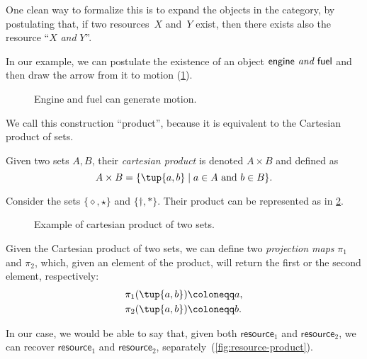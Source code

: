 One clean way to formalize this is to expand the objects in the category, by postulating that, if two resources~$X$ and~$Y$ exist, then there exists also the resource ``$X$ \emph{and} $Y$''.

In our example, we can postulate the existence of an object $\mathsf{engine} \emph{ and }
\mathsf{fuel}$ and then draw the arrow from it to motion (\cref{fig:e13}).

\begin{figure}[h!]
    \centering
    \caption{Engine and fuel can generate motion. \label{fig:e13}}
\end{figure}

We call this construction ``product'', because it is equivalent to
the Cartesian product of sets.

\begin{definition}
\label{def:cartesian-product}
   Given two sets $A,B$, their \emph{cartesian product} is denoted $A\times  B$
   and defined as 
   \begin{equation}
       A\times  B=\{ \tup{a,b}\mid a\in A\text{ and } b\in B\}.
   \end{equation}
\end{definition}

\begin{example}
Consider the sets $\{\diamond,\star\}$ and $\{\dagger, \ast\}$. Their product can be represented as in \cref{fig:cartesian-product}.
\begin{figure}[h!]
    \centering
    \caption{Example of cartesian product of two sets.\label{fig:cartesian-product}}
\end{figure}
\end{example}

\noindent Given the Cartesian product of two sets, we can define two \emph{projection maps} $\pi_1$
and $\pi_2$, which, given an element of the product, will return the first or the second
element, respectively:
\begin{equation}
\begin{aligned}
    \pi_1(\tup{a,b}) &\coloneqq a,\\
    \pi_2(\tup{a,b}) &\coloneqq b.
\end{aligned}
\end{equation}

In our case, we would be able to say that, given both $\mathsf{resource}_1$ and $\mathsf{resource}_2$,
we can recover $\mathsf{resource}_1$ and $\mathsf{resource}_2$, separately~(\cref{fig:resource-product}).

